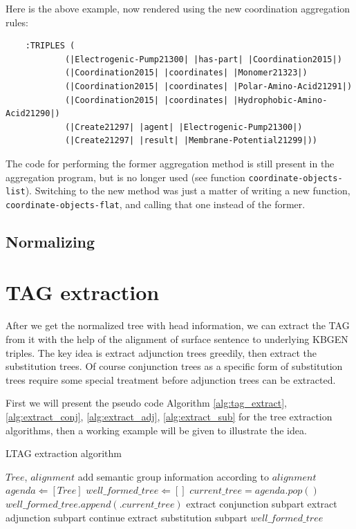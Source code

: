 \documentclass[a4paper]{article}
\begin{document}
Here is the above example, now rendered using the new coordination
aggregation rules:

\begin{verbatim}
    :TRIPLES (
            (|Electrogenic-Pump21300| |has-part| |Coordination2015|)
            (|Coordination2015| |coordinates| |Monomer21323|)
            (|Coordination2015| |coordinates| |Polar-Amino-Acid21291|)
            (|Coordination2015| |coordinates| |Hydrophobic-Amino-Acid21290|)
            (|Create21297| |agent| |Electrogenic-Pump21300|)
            (|Create21297| |result| |Membrane-Potential21299|))
\end{verbatim}

The code for performing the former aggregation method is still present
in the aggregation program, but is no longer used (see function
\texttt{coordinate-objects-list}). Switching to the new method was
just a matter of writing a new function,
\texttt{coordinate-objects-flat}, and calling that one instead of the
former.

\subsection{Normalizing}

\section{TAG extraction}
\label{sec:tag-ext}
After we get the normalized tree with head information, we can extract the TAG from it with the help of the alignment of surface sentence to underlying KBGEN triples.
The key idea is extract adjunction trees greedily, then extract the substitution trees. Of course conjunction trees as a specific form of substitution trees require
some special treatment before adjunction trees can be extracted.

First we will present the pseudo code Algorithm \ref{alg:tag_extract}, \ref{alg:extract_conj}, \ref{alg:extract_adj}, \ref{alg:extract_sub} for the tree extraction algorithms, then a working example will be given to illustrate the idea.
\begin{algorithm}
    \caption{LTAG extraction algorithm}
    \label{alg:tag_extract}
    \begin{algorithmic}[1]
        \REQUIRE $Tree$, $alignment$ 
        \STATE add semantic group information according to $alignment$
        \ENDFOR
        \STATE $agenda \Leftarrow [Tree]$
        \STATE $well\_formed\_tree \Leftarrow []$
            \STATE $current\_tree = agenda.pop() $
            \STATE $well\_formed\_tree.append(.current\_tree)$
            \ENDIF
            \STATE extract conjunction subpart
            \STATE extract adjunction subpart
                \STATE continue
            \ELSE
                \STATE extract substitution subpart
            \ENDIF
        \ENDWHILE
        \RETURN $well\_formed\_tree$
    \end{algorithmic}
\end{algorithm}
\end{document}
